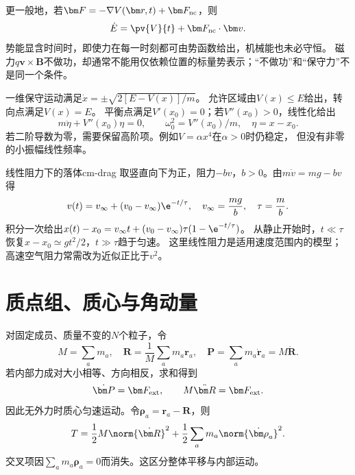 更一般地，若$\bm F=-\nabla V(\bm r,t)+\bm F_{\rm nc}$，则
\begin{equation}
 \dot E=\pv{V}{t}+\bm F_{\rm nc}\cdot\bm v.
 \label{eq:cm-energy-work}
\end{equation}
势能显含时间时，即使力在每一时刻都可由势函数给出，机械能也未必守恒。
磁力$q\bm v\times\bm B$不做功，却通常不能用仅依赖位置的标量势表示；“不做功”和“保守力”不是同一个条件。

一维保守运动满足$\dot x=\pm\sqrt{2[E-V(x)]/m}$。
允许区域由$V(x)\leq E$给出，转向点满足$V(x)=E$。
平衡点满足$V'(x_0)=0$；若$V''(x_0)>0$，线性化给出
\begin{equation}
 m\ddot\eta+V''(x_0)\eta=0,\qquad
 \omega_0^2=V''(x_0)/m,
 \quad \eta=x-x_0.
\end{equation}
若二阶导数为零，需要保留高阶项。例如$V=\alpha x^4$在$\alpha>0$时仍稳定，
但没有非零的小振幅线性频率。

\begin{example}{线性阻力下的落体}{cm-drag}
取竖直向下为正，阻力$-bv$，$b>0$。由$m\dot v=mg-bv$得
\begin{equation}
 v(t)=v_\infty+(v_0-v_\infty)\e^{-t/\tau},\quad
 v_\infty=\frac{mg}{b},\quad \tau=\frac mb.
\end{equation}
积分一次给出$x(t)-x_0=v_\infty t+(v_0-v_\infty)\tau(1-\e^{-t/\tau})$。
从静止开始时，$t\ll\tau$恢复$x-x_0\simeq gt^2/2$，$t\gg\tau$趋于匀速。
这里线性阻力是适用速度范围内的模型；高速空气阻力常需改为近似正比于$v^2$。
\end{example}

\section{质点组、质心与角动量}
对固定成员、质量不变的$N$个粒子，令
\begin{equation}
 M=\sum_a m_a,\quad \bm R=\frac1M\sum_a m_a\bm r_a,
 \quad \bm P=\sum_a m_a\dot{\bm r}_a=M\dot{\bm R}.
\end{equation}
若内部力成对大小相等、方向相反，求和得到
\begin{equation}
 \dot{\bm P}=\bm F_{\rm ext},\qquad M\ddot{\bm R}=\bm F_{\rm ext}.
\end{equation}
因此无外力时质心匀速运动。令$\bm\rho_a=\bm r_a-\bm R$，则
\begin{equation}
 T=\frac12M\norm{\dot{\bm R}}^2+\frac12\sum_a m_a\norm{\dot{\bm\rho}_a}^2.
 \label{eq:cm-com-energy}
\end{equation}
交叉项因$\sum_a m_a\bm\rho_a=0$而消失。这区分整体平移与内部运动。

